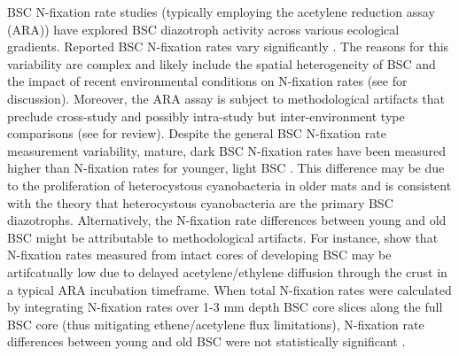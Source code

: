 BSC N-fixation rate studies (typically employing the acetylene reduction assay
(ARA)) have explored BSC diazotroph activity across various ecological
gradients. Reported BSC N-fixation rates vary significantly \cite{Evans_2001}.
The reasons for this variability are complex and likely include the spatial
heterogeneity of BSC \cite{Evans_2001} and the impact of recent environmental
conditions on N-fixation rates (see \citet{Belnap_2001} for discussion).
Moreover, the ARA assay is subject to methodological artifacts that preclude
cross-study and possibly intra-study but inter-environment type comparisons
(see \citet{Belnap_2001} for review). Despite the general BSC N-fixation rate
measurement variability, mature, dark BSC N-fixation rates have been measured
higher than N-fixation rates for younger, light BSC \cite{Belnap_2002,
14766579}. This difference may be due to the proliferation of heterocystous
cyanobacteria in older mats and is consistent with the theory that
heterocystous cyanobacteria are the primary BSC diazotrophs. Alternatively, the
N-fixation rate differences between young and old BSC might be attributable to
methodological artifacts. For instance, \citet{15643930} show that N-fixation
rates measured from intact cores of developing BSC may be artifcatually low due
to delayed acetylene/ethylene diffusion through the crust in a typical ARA
incubation timeframe. When total N-fixation rates were calculated by
integrating N-fixation rates over 1-3 mm depth BSC core slices along the full
BSC core (thus mitigating ethene/acetylene flux limitations), N-fixation rate
differences between young and old BSC were not statistically significant
\cite{15643930}.

